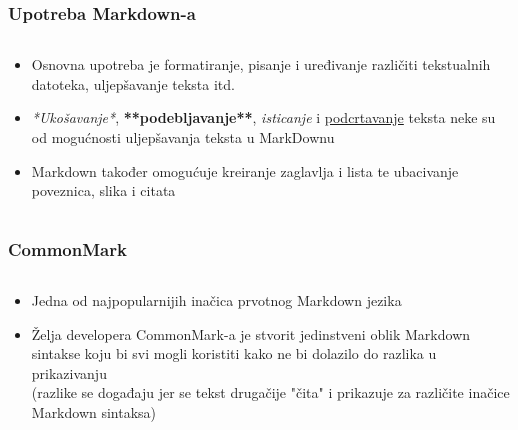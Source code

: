 \documentclass{beamer}
\begin{document}
\begin{frame}
	\frametitle{Upotreba Markdown-a}

 	\begin{minipage}[0.2\textheight]{\textwidth}
 	\begin{columns}[T]
 	\begin{column}{0.8\textwidth}
 	\begin{itemize}
		\item{Osnovna upotreba je formatiranje, pisanje i uređivanje različiti tekstualnih datoteka, uljepšavanje teksta itd.}
		\item{\textit{*Ukošavanje*}, \textbf{**podebljavanje**}, \emph{isticanje} i \underline{podcrtavanje} teksta neke su od mogućnosti uljepšavanja teksta u MarkDownu}
		\item{Markdown također omogućuje kreiranje zaglavlja i lista te ubacivanje poveznica, slika i citata}
	\end{itemize}
	\end{column}
	\end{columns}
	\end{minipage}

\end{frame}





\begin{frame}
	\frametitle{CommonMark}

 	\begin{minipage}[0.2\textheight]{\textwidth}
 	\begin{columns}[T]
 	\begin{column}{0.8\textwidth}
 	\begin{itemize}
		\item{Jedna od najpopularnijih inačica prvotnog Markdown jezika}
		\item{Želja developera CommonMark-a je stvorit jedinstveni oblik Markdown sintakse koju bi svi mogli koristiti kako ne bi dolazilo do razlika u prikazivanju \\(razlike se događaju jer se tekst drugačije "čita" i prikazuje za različite inačice Markdown sintaksa)}
	\end{itemize}
	\end{column}
	\end{columns}
	\end{minipage}

\end{frame}
\end{document}
